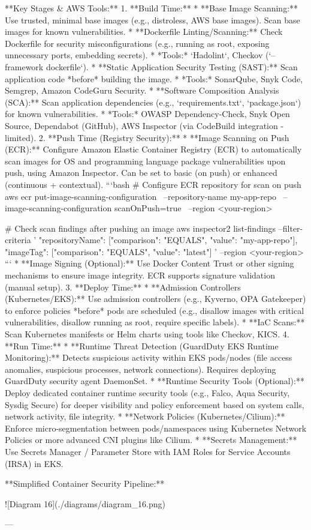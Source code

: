 \documentclass{article}
\begin{document}
**Key Stages & AWS Tools:**
1.  **Build Time:**
    * **Base Image Scanning:** Use trusted, minimal base images (e.g., distroless, AWS base images). Scan base images for known vulnerabilities.
    * **Dockerfile Linting/Scanning:** Check Dockerfile for security misconfigurations (e.g., running as root, exposing unnecessary ports, embedding secrets).
        * *Tools:* `Hadolint`, Checkov (`--framework dockerfile`).
    * **Static Application Security Testing (SAST):** Scan application code *before* building the image.
        * *Tools:* SonarQube, Snyk Code, Semgrep, Amazon CodeGuru Security.
    * **Software Composition Analysis (SCA):** Scan application dependencies (e.g., `requirements.txt`, `package.json`) for known vulnerabilities.
        * *Tools:* OWASP Dependency-Check, Snyk Open Source, Dependabot (GitHub), AWS Inspector (via CodeBuild integration - limited).
2.  **Push Time (Registry Security):**
    * **Image Scanning on Push (ECR):** Configure Amazon Elastic Container Registry (ECR) to automatically scan images for OS and programming language package vulnerabilities upon push, using Amazon Inspector. Can be set to basic (on push) or enhanced (continuous + contextual).
        ```bash
        # Configure ECR repository for scan on push
        aws ecr put-image-scanning-configuration \
            --repository-name my-app-repo \
            --image-scanning-configuration scanOnPush=true \
            --region <your-region>

        # Check scan findings after pushing an image
        aws inspector2 list-findings --filter-criteria '{ "repositoryName": [{"comparison": "EQUALS", "value": "my-app-repo"}], "imageTag": [{"comparison": "EQUALS", "value": "latest"}] }' --region <your-region>
        ```
    * **Image Signing (Optional):** Use Docker Content Trust or other signing mechanisms to ensure image integrity. ECR supports signature validation (manual setup).
3.  **Deploy Time:**
    * **Admission Controllers (Kubernetes/EKS):** Use admission controllers (e.g., Kyverno, OPA Gatekeeper) to enforce policies *before* pods are scheduled (e.g., disallow images with critical vulnerabilities, disallow running as root, require specific labels).
    * **IaC Scans:** Scan Kubernetes manifests or Helm charts using tools like Checkov, KICS.
4.  **Run Time:**
    * **Runtime Threat Detection (GuardDuty EKS Runtime Monitoring):** Detects suspicious activity within EKS pods/nodes (file access anomalies, suspicious processes, network connections). Requires deploying GuardDuty security agent DaemonSet.
    * **Runtime Security Tools (Optional):** Deploy dedicated container runtime security tools (e.g., Falco, Aqua Security, Sysdig Secure) for deeper visibility and policy enforcement based on system calls, network activity, file integrity.
    * **Network Policies (Kubernetes/Cilium):** Enforce micro-segmentation between pods/namespaces using Kubernetes Network Policies or more advanced CNI plugins like Cilium.
    * **Secrets Management:** Use Secrets Manager / Parameter Store with IAM Roles for Service Accounts (IRSA) in EKS.

**Simplified Container Security Pipeline:**


![Diagram 16](./diagrams/diagram_16.png)



---
\end{document}
